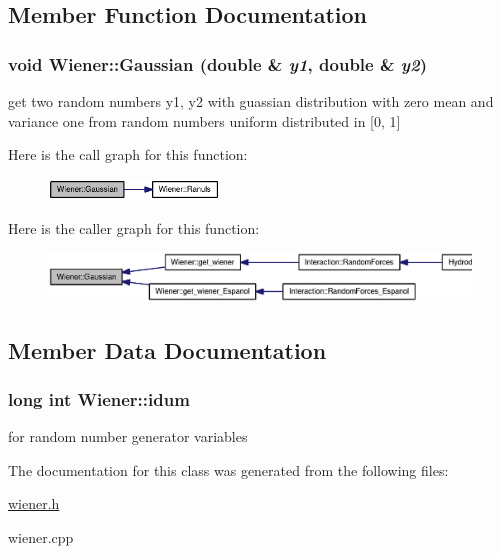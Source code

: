 \subsection{Member Function Documentation}
\hypertarget{classWiener_afdd7d1aa80e1609edd7bcc7532d56d6}{
\subsubsection[{Gaussian}]{\setlength{\rightskip}{0pt plus 5cm}void Wiener::Gaussian (double \& {\em y1}, \/  double \& {\em y2})}}
\label{classWiener_afdd7d1aa80e1609edd7bcc7532d56d6}


get two random numbers y1, y2 with guassian distribution with zero mean and variance one from random numbers uniform distributed in \mbox{[}0, 1\mbox{]} 

Here is the call graph for this function:\nopagebreak
\begin{figure}[H]
\begin{center}
\leavevmode
\includegraphics[width=129pt]{classWiener_afdd7d1aa80e1609edd7bcc7532d56d6_cgraph}
\end{center}
\end{figure}


Here is the caller graph for this function:\nopagebreak
\begin{figure}[H]
\begin{center}
\leavevmode
\includegraphics[width=420pt]{classWiener_afdd7d1aa80e1609edd7bcc7532d56d6_icgraph}
\end{center}
\end{figure}


\subsection{Member Data Documentation}
\hypertarget{classWiener_eb32502c4439ae23e7a6922c5d8cd3ba}{
\subsubsection[{idum}]{\setlength{\rightskip}{0pt plus 5cm}long int {\bf Wiener::idum}}}
\label{classWiener_eb32502c4439ae23e7a6922c5d8cd3ba}


for random number generator variables 

The documentation for this class was generated from the following files:\begin{CompactItemize}
\item 
\hyperlink{wiener_8h}{wiener.h}\item 
wiener.cpp\end{CompactItemize}
